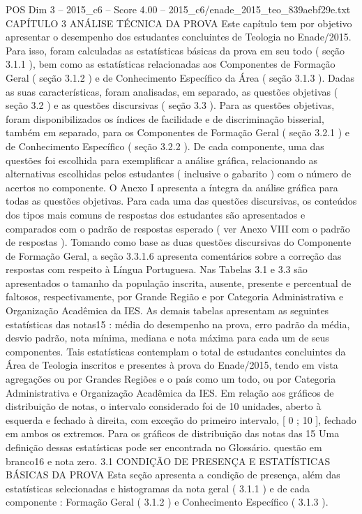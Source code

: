\begin{textsample}{POS Dim 3 – 2015\_c6 – Score 4.00 – 2015\_c6/enade\_2015\_teo\_839aebf29e.txt}  \label{ex:f3_pos_211}
CAPÍTULO 3 ANÁLISE TÉCNICA DA PROVA Este capítulo tem por objetivo apresentar o desempenho dos estudantes concluintes de Teologia no Enade/2015.
Para isso, foram calculadas as estatísticas básicas da prova em seu todo ( seção 3.1.1 ), bem como as estatísticas relacionadas aos Componentes de Formação Geral ( seção 3.1.2 ) e de Conhecimento Específico da Área ( seção 3.1.3 ).
Dadas as suas características, foram analisadas, em separado, as questões objetivas ( seção 3.2 ) e as questões discursivas ( seção 3.3 ).
Para as questões objetivas, foram disponibilizados os índices de facilidade e de discriminação bisserial, também em separado, para os Componentes de Formação Geral ( seção 3.2.1 ) e de Conhecimento Específico ( seção 3.2.2 ).
De cada componente, uma das questões foi escolhida para exemplificar a análise gráfica, relacionando as alternativas escolhidas pelos estudantes ( inclusive o gabarito ) com o número de acertos no componente.
O Anexo I apresenta a íntegra da análise gráfica para todas as questões objetivas.
Para cada uma das questões discursivas, os conteúdos dos tipos mais comuns de respostas dos estudantes são apresentados e comparados com o padrão de respostas esperado ( ver Anexo VIII com o padrão de respostas ).
Tomando como base as duas questões discursivas do Componente de Formação Geral, a seção 3.3.1.6 apresenta comentários sobre a correção das respostas com respeito à Língua Portuguesa.
Nas Tabelas 3.1 e 3.3 são apresentados o tamanho da população inscrita, ausente, presente e percentual de faltosos, respectivamente, por Grande Região e por Categoria Administrativa e Organização Acadêmica da IES.
As demais tabelas apresentam as seguintes estatísticas das notas15 : média do desempenho na prova, erro padrão da média, desvio padrão, nota mínima, mediana e nota máxima para cada um de seus componentes.
Tais estatísticas contemplam o total de estudantes concluintes da Área de Teologia inscritos e presentes à prova do Enade/2015, tendo em vista agregações ou por Grandes Regiões e o país como um todo, ou por Categoria Administrativa e Organização Acadêmica da IES.
Em relação aos gráficos de distribuição de notas, o intervalo considerado foi de 10 unidades, aberto à esquerda e fechado à direita, com exceção do primeiro intervalo, [ 0 ; 10 ], fechado em ambos os extremos.
Para os gráficos de distribuição das notas das 15 Uma definição dessas estatísticas pode ser encontrada no Glossário. questão em branco16 e nota zero. 3.1 CONDIÇÃO DE PRESENÇA E ESTATÍSTICAS BÁSICAS DA PROVA Esta seção apresenta a condição de presença, além das estatísticas selecionadas e histogramas da nota geral ( 3.1.1 ) e de cada componente : Formação Geral ( 3.1.2 ) e Conhecimento Específico ( 3.1.3 ).

\end{textsample}
